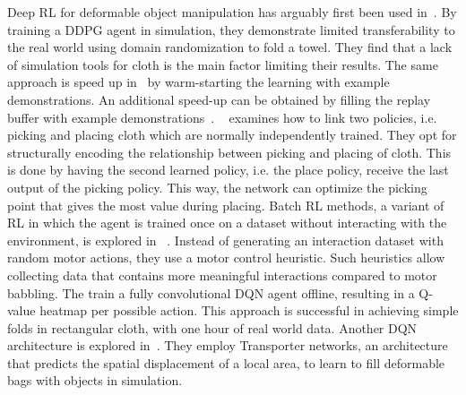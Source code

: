 \documentclass[\home/main.tex]{subfiles}
\begin{document}
Deep RL for deformable object manipulation has arguably first been used in~\autocite{Matas2018}. By training a DDPG agent in simulation, they demonstrate limited transferability to the real world using domain randomization to fold a towel. They find that a lack of simulation tools for cloth is the main factor limiting their results. The same approach is speed up in~\autocite{Jangir2020} by warm-starting the learning with example demonstrations. An additional speed-up can be obtained by filling the replay buffer with example demonstrations~\autocite{Tsurumine2019}. ~\textcite{Wu2020} examines how to link two policies, i.e. picking and placing cloth which are normally independently trained. They opt for structurally encoding the relationship between picking and placing of cloth. This is done by having the second learned policy, i.e. the place policy, receive the last output of the picking policy. This way, the network can optimize the picking point that gives the most value during placing. Batch RL methods, a variant of RL in which the agent is trained once on a dataset without interacting with the environment, is explored in ~\autocite{lee2020learning}. Instead of generating an interaction dataset with random motor actions, they use a motor control heuristic. Such heuristics allow collecting data that contains more meaningful interactions compared to motor babbling. The train a fully convolutional DQN agent offline, resulting in a Q-value heatmap per possible action. This approach is successful in achieving simple folds in rectangular cloth, with one hour of real world data. Another DQN architecture is explored in~\autocite{seita2021learning}. They employ Transporter networks, an architecture that predicts the spatial displacement of a local area, to learn to fill deformable bags with objects in simulation. 
\end{document}
